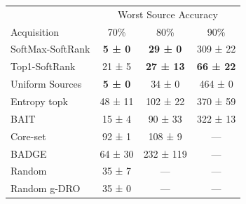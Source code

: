 \begin{tabular}{lccc}
\toprule
&\multicolumn{3}{c}{Worst Source Accuracy} \\
Acquisition & 70\% & 80\% & 90\% \\
\midrule
SoftMax-SoftRank & \textbf{5 ± 0} & \textbf{29 ± 0} & 309 ± 22 \\
Top1-SoftRank & 21 ± 5 & \textbf{27 ± 13} & \textbf{66 ± 22} \\
 Uniform Sources & \textbf{5 ± 0} & 34 ± 0 & 464 ± 0 \\
Entropy topk & 48 ± 11 & 102 ± 22 & 370 ± 59 \\
BAIT & 15 ± 4 & 90 ± 33 & 322 ± 13 \\
Core-set & 92 ± 1 & 108 ± 9 & — \\
BADGE & 64 ± 30 & 232 ± 119 & — \\
Random & 35 ± 7 & — & — \\
Random g-DRO & 35 ± 0 & — & — \\
\bottomrule
\end{tabular}